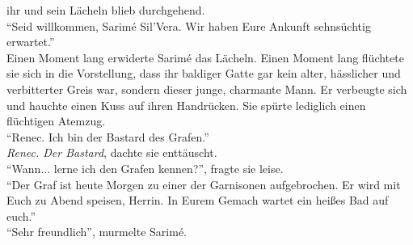ihr und sein Lächeln blieb durchgehend.\\
``Seid willkommen, Sarimé Sil'Vera. Wir haben Eure Ankunft sehnsüchtig erwartet.''\\
Einen Moment lang erwiderte Sarimé das Lächeln. Einen Moment lang flüchtete sie sich in die 
Vorstellung, dass ihr baldiger Gatte gar kein alter, hässlicher und verbitterter Greis war, sondern 
dieser junge, charmante Mann. Er verbeugte sich und hauchte einen Kuss auf ihren Handrücken. Sie 
spürte lediglich einen flüchtigen Atemzug.\\
``Renec. Ich bin der Bastard des Grafen.''\\
\textit{Renec. Der Bastard}, dachte sie enttäuscht. \\ 
``Wann... lerne ich den Grafen kennen?'', fragte sie leise.\\
``Der Graf ist heute Morgen zu einer der Garnisonen aufgebrochen. Er wird mit Euch zu Abend 
speisen, Herrin. In Eurem Gemach wartet ein heißes Bad auf euch.''\\
``Sehr freundlich'', murmelte Sarimé.\\
 
